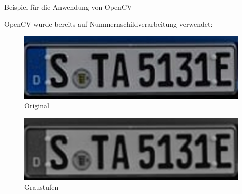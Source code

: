 \begin{frame}{Beispiel für die Anwendung von OpenCV}

OpenCV wurde bereits auf Nummernschildverarbeitung verwendet:
\begin{figure}
\begin{center}
\includegraphics[scale=0.25]{bilder/Nummer_1.png}
\caption{Original}
\label{Original}
\end{center}
\end{figure}

\begin{figure}
\begin{center}
\includegraphics[scale=0.25]{bilder/Nummer_2_grau.png}
\caption{Graustufen}
\label{Graustufen}
\end{center}
\end{figure}

\end{frame}

